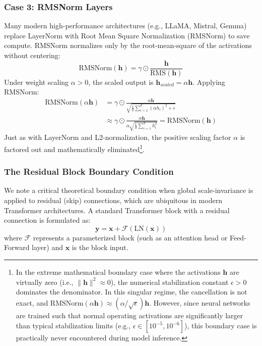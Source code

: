 \subsubsection{Case 3: RMSNorm Layers}
Many modern high-performance architectures (e.g., LLaMA, Mistral, Gemma) replace LayerNorm with Root Mean Square Normalization (RMSNorm) to save compute. RMSNorm normalizes only by the root-mean-square of the activations without centering:
\begin{equation}
    \text{RMSNorm}(\mathbf{h}) = \gamma \odot \frac{\mathbf{h}}{\text{RMS}(\mathbf{h})}
\end{equation}
Under weight scaling $\alpha > 0$, the scaled output is $\mathbf{h}_{scaled} = \alpha \mathbf{h}$. Applying RMSNorm:
\begin{align}
    \text{RMSNorm}(\alpha \mathbf{h}) &= \gamma \odot \frac{\alpha \mathbf{h}}{\sqrt{\frac{1}{d} \sum_{i=1}^d (\alpha h_i)^2 + \epsilon}} \nonumber \\
    &\approx \gamma \odot \frac{\alpha \mathbf{h}}{\alpha \sqrt{\frac{1}{d} \sum_{i=1}^d h_i^2}} = \text{RMSNorm}(\mathbf{h})
\end{align}
Just as with LayerNorm and L2-normalization, the positive scaling factor $\alpha$ is factored out and mathematically eliminated\footnote{In the extreme mathematical boundary case where the activations $\mathbf{h}$ are virtually zero (i.e., $\|\mathbf{h}\|^2 \approx 0$), the numerical stabilization constant $\epsilon > 0$ dominates the denominator. In this singular regime, the cancellation is not exact, and $\text{RMSNorm}(\alpha \mathbf{h}) \approx (\alpha / \sqrt{\epsilon}) \mathbf{h}$. However, since neural networks are trained such that normal operating activations are significantly larger than typical stabilization limits (e.g., $\epsilon \in [10^{-5}, 10^{-6}]$), this boundary case is practically never encountered during model inference.}.

\subsubsection{The Residual Block Boundary Condition}
We note a critical theoretical boundary condition when global scale-invariance is applied to residual (skip) connections, which are ubiquitous in modern Transformer architectures. A standard Transformer block with a residual connection is formulated as:
\begin{equation}
    \mathbf{y} = \mathbf{x} + \mathcal{F}(\text{LN}(\mathbf{x}))
\end{equation}
where $\mathcal{F}$ represents a parameterized block (such as an attention head or Feed-Forward layer) and $\mathbf{x}$ is the block input. 

